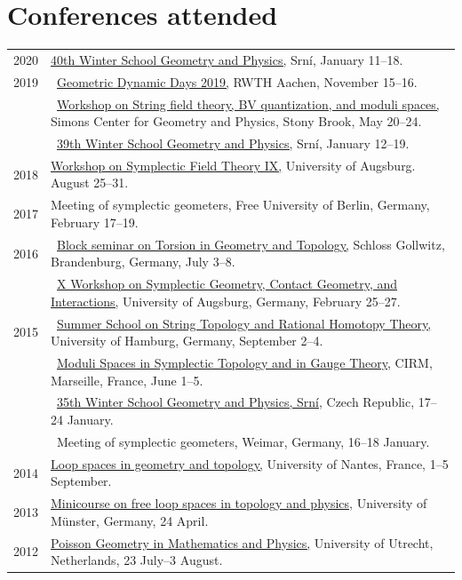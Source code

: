 \documentclass[a4paper,12pt]{article}
\begin{document}
\section*{Conferences attended}
%
\begin{tabularx}{\textwidth}{@{}lX@{}}
2020 	& \href{http://conference.math.muni.cz/srni/}{40th Winter School Geometry and Physics,} Srn\'i, January 11--18.\\
2019 	& \textbullet~\href{https://www.mathga.rwth-aachen.de/en/news/gdd2019/}{Geometric Dynamic Days 2019,} RWTH Aachen, November 15--16.\\
	& \textbullet~\href{http://scgp.stonybrook.edu/archives/25214}{Workshop on String field theory, BV quantization, and moduli spaces,} Simons Center for Geometry and Physics, Stony Brook, May 20--24.\\
	& \textbullet~\href{http://conference.math.muni.cz/srni/}{39th Winter School Geometry and Physics,} Srn\'i, January 12--19.\\
2018 	&  \href{https://www.math.uni-augsburg.de/prof/geo/SFTIX/}{Workshop on Symplectic Field Theory IX,} University of Augsburg. August 25--31.\\
2017 	&  Meeting of symplectic geometers, Free University of Berlin, Germany, February 17--19.\\
2016 	& \textbullet~\href{https://www.math.uni-potsdam.de/professuren/geometrie/lehre/blockseminare/2016-brandenburg/}{Block seminar on  Torsion in Geometry and Topology,} Schloss Gollwitz, Brandenburg, Germany, July 3--8.\\
	& \textbullet~\href{https://www.math.uni-augsburg.de/prof/geo/Cast2016/}{X Workshop on Symplectic Geometry, Contact Geometry, and Interactions,} University of Augsburg, Germany, February 25--27.\\
2015 	& \textbullet~\href{http://grk1670.math.uni-hamburg.de/ratstr2015/}{Summer School on String Topology and Rational Homotopy Theory,} University of Hamburg, Germany, September 2--4.\\
	& \textbullet~\href{https://lalondeteleman.weebly.com/main-conference.html}{Moduli Spaces in Symplectic Topology and in Gauge Theory}, CIRM, Marseille, France, June 1--5.\\
	& \textbullet~\href{http://conference.math.muni.cz/srni/}{35th Winter School Geometry and Physics, Srn\'i,} Czech Republic, 17--24 January.\\
	& \textbullet~Meeting of symplectic geometers, Weimar, Germany, 16--18 January.\\ 
2014 	& \href{https://www.lebesgue.fr/content/sem2014-loops}{Loop spaces in geometry and topology,} University of Nantes, France,  1--5 September.\\
2013	& \href{https://www.uni-muenster.de/FB10/Service/show_article.shtml?id=4161\&brettid=8}{Minicourse on free loop spaces in topology and physics,} University of M\"unster, Germany, 24 April.\\
2012 	& \href{http://www.projects.science.uu.nl/poisson2012/Home.php}{Poisson Geometry in Mathematics and Physics,} University of Utrecht, Netherlands, 23 July--3 August.
\end{tabularx}
%
\end{document}
